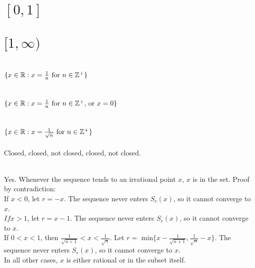 \begin{parts}
 
 \part{$[0,1]$}
 \part{$[1,\infty)$}
 \part{$\{x\in\mathbb{R}:x=\frac{1}{n} \text{ for }n \in \mathbb{Z}^+\}$}
  \part{$\{x\in\mathbb{R}:x=\frac{1}{n} \text{ for }n \in \mathbb{Z}^+\text{, or }x=0\}$}
  \part{$\{x\in\mathbb{R}:x=\frac{1}{\sqrt{n}} \text{ for } n \in \mathbb{Z}^+\}$}
  
\end{parts}

\begin{solution}
 Closed, closed, not closed, closed, not closed.
\end{solution}


\begin{solution}
 \\Yes. Whenever the sequence tends to an irrational point $x$, $x$ is in the set. Proof by contradiction: \\
 If $x < 0$, let $r = -x$. The sequence never enters $S_r(x)$, so it cannot converge to $x$. \\
 $If x > 1$, let $r = x-1$. The sequence never enters $S_r(x)$, so it cannot converge to $x$. \\
If $0<x<1$, then $\frac{1}{\sqrt{n+1}} < x < \frac{1}{\sqrt{n}}$. Let $r = \text{ min} \{x-\frac{1}{\sqrt{n+1}}, \frac{1}{\sqrt{n}}-x\}$. The sequence never enters $S_r(x)$, so it cannot converge to $x$. \\
In all other cases, $x$ is either rational or in the subset itself.
\end{solution}

